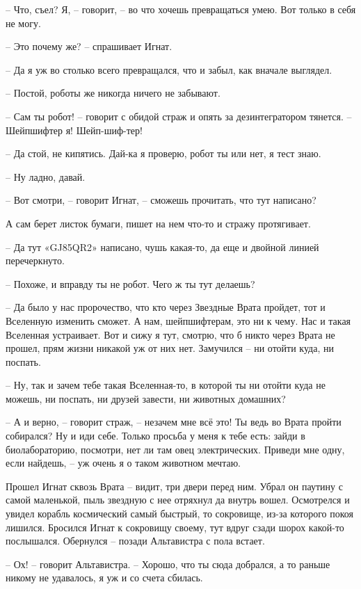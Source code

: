 \documentclass[ebook,oneside,final,openright]{memoir}
\begin{document}
– Что, съел? Я, – говорит, – во что хочешь превращаться умею. Вот только в себя не могу. \par
– Это почему же? – спрашивает Игнат.\par
– Да я уж во столько всего превращался, что и забыл, как вначале выглядел. \par
– Постой, роботы же никогда ничего не забывают. \par
– Сам ты робот! – говорит с обидой страж и опять за дезинтегратором тянется. – Шейпшифтер я! Шейп-шиф-тер! \par
– Да стой, не кипятись. Дай-ка я проверю, робот ты или нет, я тест знаю. \par
– Ну ладно, давай. \par
– Вот смотри, – говорит Игнат, – сможешь прочитать, что тут написано? \par
А сам берет листок бумаги, пишет на нем что-то и стражу протягивает. \par
– Да тут «GJ85QR2» написано, чушь какая-то, да еще и двойной линией перечеркнуто.\par
– Похоже, и вправду ты не робот. Чего ж ты тут делаешь? \par
– Да было у нас пророчество, что кто через Звездные Врата пройдет, тот и Вселенную изменить сможет. А нам, шейпшифтерам, это ни к чему. Нас и такая Вселенная устраивает. Вот и сижу я тут, смотрю, что б никто через Врата не прошел, прям жизни никакой уж от них нет. Замучился – ни отойти куда, ни поспать. \par
– Ну, так и зачем тебе такая Вселенная-то, в которой ты ни отойти куда не можешь, ни поспать, ни друзей завести, ни животных домашних? \par
– А и верно, – говорит страж, – незачем мне всё это! Ты ведь во Врата пройти собирался? Ну и иди себе. Только просьба у меня к тебе есть: зайди в биолабораторию, посмотри, нет ли там овец электрических. Приведи мне одну, если найдешь, – уж очень я о таком животном мечтаю.\par
\par
\par
Прошел Игнат сквозь Врата – видит, три двери перед ним. Убрал он паутину с самой маленькой, пыль звездную с нее отряхнул да внутрь вошел. Осмотрелся и увидел корабль космический самый быстрый, то сокровище, из-за которого покоя лишился. Бросился Игнат к сокровищу своему, тут вдруг сзади шорох какой-то послышался. Обернулся – позади Альтавистра с пола встает.\par
– Ох! – говорит Альтавистра. – Хорошо, что ты сюда добрался, а то раньше никому не удавалось, я уж и со счета сбилась.\par
\end{document}
